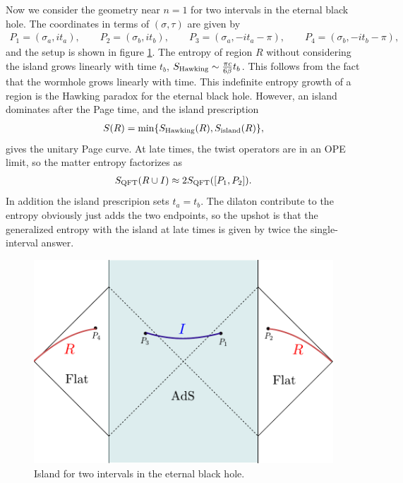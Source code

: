 \documentclass[11pt,oneside,letterpaper]{article}
\newcommand{\f}{\frac}
\let\f=\frac
\def\ba{\begin{eqnarray}}
\def\ea{\end{eqnarray}}
\numberwithin{equation}{section}
\def\ba{\begin{eqnarray}}
\def\ea{\end{eqnarray}}
\def\f {\frac}
\begin{document}
\begin{spacing}{1.1}
 Now we consider the geometry near $n=1$ for two intervals in the eternal black hole. The coordinates in terms of $(\sigma, \tau)$ are given by
 \ba
P_1 = (\sigma_a, i t_a), \qquad P_2 = (\sigma_b, i t_b), \qquad P_3 = (\sigma_a, -i t_a - \pi), \qquad P_4= (\sigma_b, -i t_b - \pi),
\ea 
 and the setup is shown in figure \ref{fig:twointerval}. The  entropy of region $R$ without considering the island grows linearly with time $t_b$, $S_{\rm Hawking} \sim \f{\pi c}{6 \beta} t_b$. This follows from  the fact that the wormhole grows linearly with time\cite{Hartman:2013qma,Susskind:2014moa}. This indefinite entropy growth of a region is the Hawking paradox for the eternal black hole.  However, an island dominates after the Page time, and the island prescription
\ba 
S(R) = \text{min} \{ S_{\rm Hawking} (R), S_{\rm island} (R)\},
\ea
gives the unitary Page curve. 
At late times, the twist operators are in an OPE limit, so the matter entropy factorizes as
\ba 
S_{\rm QFT} (R \cup I) \approx 2 S_{\rm QFT} ([P_1, P_2]).
\ea 
In addition the  island prescripion sets $t_a= t_b$. The dilaton contribute to the entropy obviously just adds the two endpoints, so the upshot is that the generalized entropy with the island at late times is given by twice the single-interval answer. 
\begin{figure}[h!]
\centering
\includegraphics[scale=0.74]{./figures/eternalBH-lorentzian.pdf}
\caption{Island for two intervals in the eternal black hole.} \label{fig:twointerval}
\end{figure}


\end{spacing}
\end{document}
